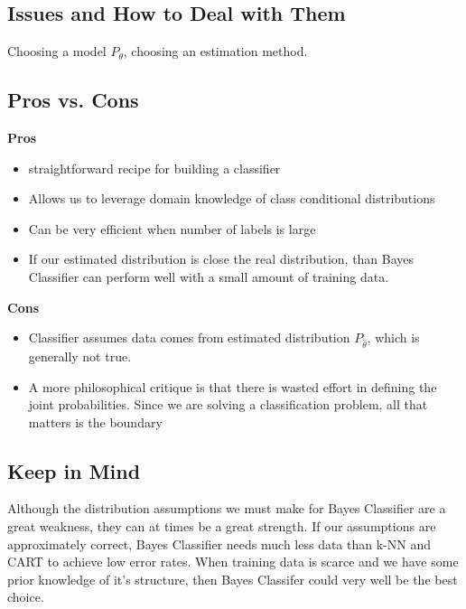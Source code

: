 \documentclass[10pt]{article}
\begin{document}
	\subsection*{Issues and How to Deal with Them}
		Choosing a model $P_\theta$, choosing an estimation method. 
	\subsection*{Pros vs. Cons}		
		\textbf{Pros}
		\begin{itemize}
			\item straightforward recipe for building a classifier
			\item Allows us to leverage domain knowledge of class conditional distributions
			\item Can be very efficient when number of labels is large
			\item If our estimated distribution is close the real distribution, than Bayes Classifier
				can perform well with a small amount of training data. 
		\end{itemize}
		\textbf{Cons}
		\begin{itemize}
			\item Classifier assumes data comes from estimated distribution $P_{\hat \theta}$, which 
				is generally not true. 
			\item A more philosophical critique is that there is wasted effort in defining the joint
				probabilities. Since we are solving a classification problem, all that matters 
				is the boundary
		\end{itemize}
	\subsection*{Keep in Mind}
		Although the distribution assumptions we must make for Bayes Classifier are a great
		weakness, they can at times be a great strength. If our assumptions are approximately correct, 
		Bayes Classifier needs much less data than k-NN and CART to achieve low error rates. When
		training data is scarce and we have some prior knowledge of it's structure, then Bayes Classifer
		could very well be the best choice.
\end{document}
